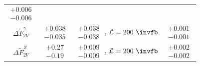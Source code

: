 \begin{table}[t]
\begin{center}
\begin{footnotesize}
\begin{tabular}{|cccc|}
$\begin{matrix} +0.006 \\[-4pt] -0.006\end{matrix}$
\\
$\Delta\widetilde F^\gamma_{2V}$ &
$\begin{matrix} +0.038 \\[-4pt] -0.035\end{matrix}$ &
$\begin{matrix} +0.038 \\[-4pt] -0.038\end{matrix}$ , $\mathcal{L}=200~\invfb$&
$\begin{matrix} +0.001 \\[-4pt] -0.001\end{matrix}$
\\
$\Delta\widetilde F^Z_{2V}$ &
$\begin{matrix} +0.27 \\[-4pt] -0.19\end{matrix}$ &
$\begin{matrix} +0.009 \\[-4pt] -0.009\end{matrix}$ , $\mathcal{L}=200~\invfb$  &
 $\begin{matrix} +0.002 \\[-4pt] -0.002\end{matrix}$
\\

\end{tabular}
\end{footnotesize}
\end{center}
\end{table}
